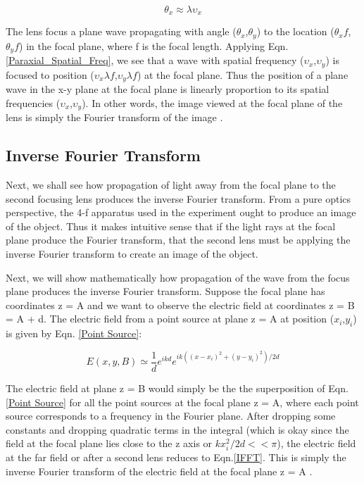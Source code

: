\documentclass[twocolumn,amsmath,amssymb,pra]{revtex4-2}
\begin{document}
\begin{equation}
    \theta_x \approx \lambda\upsilon_x
    \label{Paraxial_Spatial_Freq}
\end{equation}

The lens focus a plane wave propagating with angle ($\theta_x$,$\theta_y$) to the location ($\theta_xf$,$\theta_yf$) in the focal plane, where f is the focal length. Applying Eqn. \ref{Paraxial_Spatial_Freq}, we see that a wave with spatial frequency ($\upsilon_x$,$\upsilon_y$) is focused to position ($\upsilon_x\lambda f$,$\upsilon_y\lambda f$) at the focal plane. Thus the position of a plane wave in the x-y plane at the focal plane is linearly proportion to its spatial frequencies ($\upsilon_x$,$\upsilon_y$). In other words, the image viewed at the focal plane of the lens is simply the Fourier transform of the image \cite{tyson2014principles}. 

\subsection{Inverse Fourier Transform}
Next, we shall see how propagation of light away from the focal plane to the second focusing lens produces the inverse Fourier transform. From  a pure optics perspective, the 4-f apparatus used in the experiment ought to produce an image of the object. Thus it makes intuitive sense that if the light rays at the focal plane produce the Fourier transform, that the second lens must be applying the inverse Fourier transform to create an image of the object. 

Next, we will show mathematically how propagation of the wave from the focus plane produces the inverse Fourier transform. Suppose the focal plane has coordinates z = A and we want to observe the electric field at coordinates z = B = A + d. The electric field from a point source at plane z = A at position ($x_i$,$y_i$) is given by Eqn. \ref{Point Source}:

\begin{equation}
    E(x,y,B) \simeq \frac{1}{d}e^{ikd}e^{ik((x-x_i)^2+(y-y_i)^2)/2d}
    \label{Point Source}
\end{equation}

The electric field at plane z = B would simply be the the superposition of Eqn. \ref{Point Source} for all the point sources at the focal plane z = A, where each point source corresponds to a frequency in the Fourier plane. After dropping some constants and dropping quadratic terms in the integral (which is okay since the field at the focal plane lies close to the z axis or $kx_i^2/2d <<\pi$), the electric field at the far field or after a second lens reduces to Eqn.\ref{IFFT}. This is simply the inverse Fourier transform of the electric field at the focal plane z = A \cite{tyson2014principles}.
\end{document}
